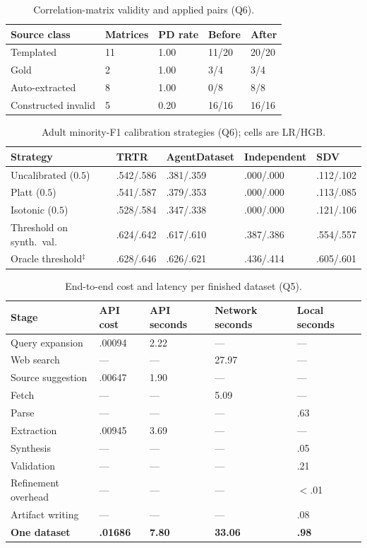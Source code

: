 \documentclass[letterpaper]{article}
\begin{document}
\begin{table}[t]
\centering
\begin{tabular}{lllll}
\toprule
Source class & Matrices & PD rate & Before & After \\
\midrule
Templated & 11 & 1.00 & 11/20 & 20/20 \\
Gold & 2 & 1.00 & 3/4 & 3/4 \\
Auto-extracted & 8 & 1.00 & 0/8 & 8/8 \\
Constructed invalid & 5 & 0.20 & 16/16 & 16/16 \\
\bottomrule
\end{tabular}
\caption{Correlation-matrix validity and applied pairs (Q6).}
\label{tab:correlation}
\end{table}

\begin{table}[t]
\centering
\begin{tabular}{lllll}
\toprule
Strategy & TRTR & AgentDataset & Independent & SDV \\
\midrule
Uncalibrated ($0.5$) & .542/.586 & .381/.359 & .000/.000 & .112/.102 \\
Platt ($0.5$) & .541/.587 & .379/.353 & .000/.000 & .113/.085 \\
Isotonic ($0.5$) & .528/.584 & .347/.338 & .000/.000 & .121/.106 \\
Threshold on synth.\ val. & .624/.642 & .617/.610 & .387/.386 & .554/.557 \\
\midrule
Oracle threshold$^\ddagger$ & .628/.646 & .626/.621 & .436/.414 & .605/.601 \\
\bottomrule
\end{tabular}
\caption{Adult minority-F1 calibration strategies (Q6); cells are LR/HGB.}
\label{tab:calibration}
\end{table}

\begin{table}[t]
\centering
\begin{tabular}{lllll}
\toprule
Stage & API cost & API seconds & Network seconds & Local seconds \\
\midrule
Query expansion & .00094 & 2.22 & --- & --- \\
Web search & --- & --- & 27.97 & --- \\
Source suggestion & .00647 & 1.90 & --- & --- \\
Fetch & --- & --- & 5.09 & --- \\
Parse & --- & --- & --- & .63 \\
Extraction & .00945 & 3.69 & --- & --- \\
Synthesis & --- & --- & --- & .05 \\
Validation & --- & --- & --- & .21 \\
Refinement overhead & --- & --- & --- & $<$.01 \\
Artifact writing & --- & --- & --- & .08 \\
\midrule
\textbf{One dataset} & \textbf{.01686} & \textbf{7.80} & \textbf{33.06} & \textbf{.98} \\
\bottomrule
\end{tabular}
\caption{End-to-end cost and latency per finished dataset (Q5).}
\label{tab:e2e}
\end{table}
\end{document}
